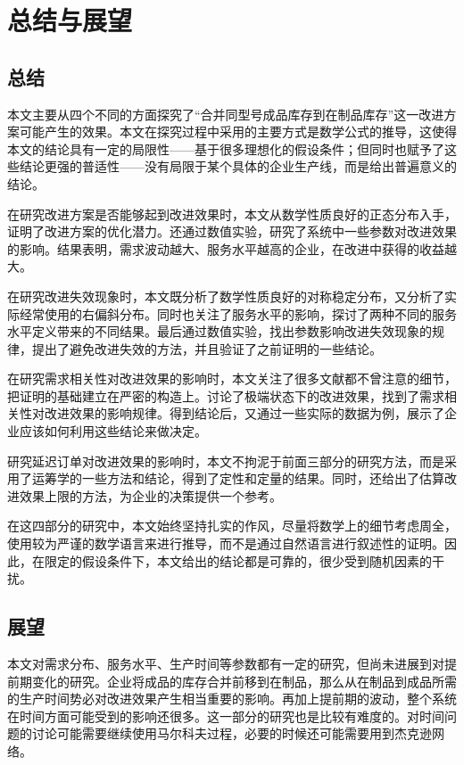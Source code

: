 \chapter{总结与展望}





\section{总结}

本文主要从四个不同的方面探究了“合并同型号成品库存到在制品库存”这一改进方案可能产生的效果。本文在探究过程中采用的主要方式是数学公式的推导，这使得本文的结论具有一定的局限性——基于很多理想化的假设条件；但同时也赋予了这些结论更强的普适性——没有局限于某个具体的企业生产线，而是给出普遍意义的结论。

在研究改进方案是否能够起到改进效果时，本文从数学性质良好的正态分布入手，证明了改进方案的优化潜力。还通过数值实验，研究了系统中一些参数对改进效果的影响。结果表明，需求波动越大、服务水平越高的企业，在改进中获得的收益越大。

在研究改进失效现象时，本文既分析了数学性质良好的对称稳定分布，又分析了实际经常使用的右偏斜分布。同时也关注了服务水平的影响，探讨了两种不同的服务水平定义带来的不同结果。最后通过数值实验，找出参数影响改进失效现象的规律，提出了避免改进失效的方法，并且验证了之前证明的一些结论。

在研究需求相关性对改进效果的影响时，本文关注了很多文献都不曾注意的细节，把证明的基础建立在严密的构造上。讨论了极端状态下的改进效果，找到了需求相关性对改进效果的影响规律。得到结论后，又通过一些实际的数据为例，展示了企业应该如何利用这些结论来做决定。

研究延迟订单对改进效果的影响时，本文不拘泥于前面三部分的研究方法，而是采用了运筹学的一些方法和结论，得到了定性和定量的结果。同时，还给出了估算改进效果上限的方法，为企业的决策提供一个参考。

在这四部分的研究中，本文始终坚持扎实的作风，尽量将数学上的细节考虑周全，使用较为严谨的数学语言来进行推导，而不是通过自然语言进行叙述性的证明。因此，在限定的假设条件下，本文给出的结论都是可靠的，很少受到随机因素的干扰。







\section{展望}

本文对需求分布、服务水平、生产时间等参数都有一定的研究，但尚未进展到对提前期变化的研究。企业将成品的库存合并前移到在制品，那么从在制品到成品所需的生产时间势必对改进效果产生相当重要的影响。再加上提前期的波动，整个系统在时间方面可能受到的影响还很多。这一部分的研究也是比较有难度的。对时间问题的讨论可能需要继续使用马尔科夫过程，必要的时候还可能需要用到杰克逊网络。

